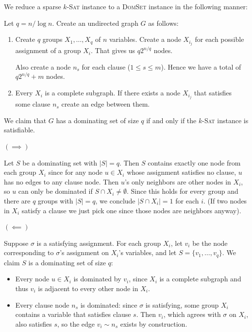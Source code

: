 \documentclass[12pt]{article}
\begin{document}
\begin{solution}
    \bbni

    We reduce a sparse $k$-\textsc{Sat} instance to a \textsc{DomSet} instance in the following manner: 

    Let $q = n/\log n$. Create an undirected graph $G$ as follows: 
    \begin{enumerate}
        \item Create $q$ groups $X_1, \ldots, X_q$ of $n$ variables. Create a node $X_{i_j}$ for each possible assignment of a group $X_i$. That gives us $q2^{n/q}$ nodes. 
        
        Also create a node $n_s$ for each clause ($1 \leq s \leq m$).  
        Hence we have a total of $q2^{n/q} + m$ nodes. 

        \item Every $X_i$ is a complete subgraph. If there exists a node $X_{i_j}$ that satisfies some clause $n_s$ create an edge between them.
    \end{enumerate}


    We claim that $G$ has a dominating set of size $q$ if and only if the $k$-\textsc{Sat} instance is satisfiable.


    $(\implies)$ 
    
    Let $S$ be a dominating set with $|S| = q$. Then $S$ contains exactly one node from each group $X_i$ since for any node $u \in X_i$ whose assignment satisfies no clause, $u$ has no edges to any clause node. Then $u$'s only neighbors are other nodes in $X_i$, so $u$ can only be dominated if $S \cap X_i \neq \emptyset$. Since this holds for every group and there are $q$ groups with $|S| = q$, we conclude $|S \cap X_i| = 1$ for each $i$. (If two nodes in $X_i$ satisfy a clause we just pick one since those nodes are neighbors anyway). 


    $(\impliedby)$ 
    
    
    Suppose $\sigma$ is a satisfying assignment. For each group $X_i$, let $v_i$ be the node corresponding to $\sigma$'s assignment on $X_i$'s variables, and let $S = \{v_1, \ldots, v_q\}$. We claim $S$ is a dominating set of size $q$:
    \begin{itemize}
        \item Every node $u \in X_i$ is dominated by $v_i$, since $X_i$ is a complete subgraph and thus $v_i$ is adjacent to every other node in $X_i$.
        \item Every clause node $n_s$ is dominated: since $\sigma$ is satisfying, some group $X_i$ contains a variable that satisfies clause $s$. Then $v_i$, which agrees with $\sigma$ on $X_i$, also satisfies $s$, so the edge $v_i \sim n_s$ exists by construction.
    \end{itemize}
    


\end{solution}
\end{document}
